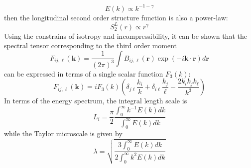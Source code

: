 \begin{equation}
    E(k)\propto k^{-1-\gamma}
\end{equation}
then the longitudinal second order structure function is also a power-law:
\begin{equation}
    S_2^L(r)\propto r^\gamma
\end{equation}
Using the constrains of isotropy and incompressibility, it can be shown that the spectral tensor corresponding to the third order moment
\begin{equation}
    F_{ij,\ell}(\mathbf{k})=\frac{1}{(2\pi)^3}\int B_{ij,\ell}(\mathbf{r})\exp(-i\mathbf{k}\cdot\mathbf{r})d\mathbf{r}
\end{equation}
can be expressed in terms of a single scalar function $F_3 (k)$:
\begin{equation}
    F_{ij,\ell}(\mathbf{k})=iF_3(k)\left(\delta_{j\ell}\frac{k_i}{k}+\delta_{i\ell}\frac{k_j}{\ell}-\frac{2k_ik_jk_\ell}{k^3}\right)
\end{equation}
In terms of the energy spectrum, the integral length scale is
\begin{equation}
    L_i=\frac{\pi}{2}\frac{\int_0^\infty k^{-1}E(k)dk}{\int_0^\infty E(k)dk}
\end{equation}
while the Taylor microscale is given by
\begin{equation}
    \lambda=\sqrt{\frac{3\int_0^\infty E(k)dk}{2\int_0^\infty k^2E(k)dk}}
\end{equation}


